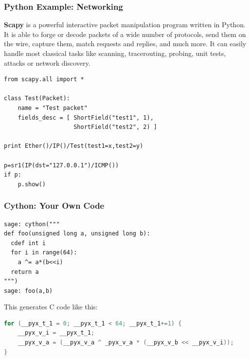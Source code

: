 \documentclass[9pt]{beamer}
\renewcommand{\emph}[1]{\textbf{\color{oxygenorange}#1}\xspace}
\begin{document}
\begin{frame}[fragile]
\frametitle{Python Example: Networking}
\begin{small}
\emph{Scapy} is a powerful interactive packet manipulation program written in Python. It is able to forge or decode packets of a wide number of protocols, send them on the wire, capture them, match requests and replies, and much more. It can easily handle most classical tasks like scanning, tracerouting, probing, unit tests, attacks or network discovery.
\end{small}

\begin{lstlisting}
from scapy.all import *

class Test(Packet):
    name = "Test packet"
    fields_desc = [ ShortField("test1", 1),
                    ShortField("test2", 2) ]

print Ether()/IP()/Test(test1=x,test2=y)

p=sr1(IP(dst="127.0.0.1")/ICMP())
if p:
    p.show()
\end{lstlisting}
\end{frame}

\begin{frame}[fragile]
\frametitle{Cython: Your Own Code}
\begin{lstlisting}
sage: cython("""
def foo(unsigned long a, unsigned long b):
  cdef int i
  for i in range(64):
    a ^= a*(b<<i)
  return a
""")
sage: foo(a,b)
\end{lstlisting}

\vspace{1em}

This generates C code like this:

\begin{lstlisting}[language=c]
for (__pyx_t_1 = 0; __pyx_t_1 < 64; __pyx_t_1+=1) {
    __pyx_v_i = __pyx_t_1;
    __pyx_v_a = (__pyx_v_a ^ _pyx_v_a * (__pyx_v_b << __pyx_v_i));
}
\end{lstlisting}
\end{frame}
\end{document}
